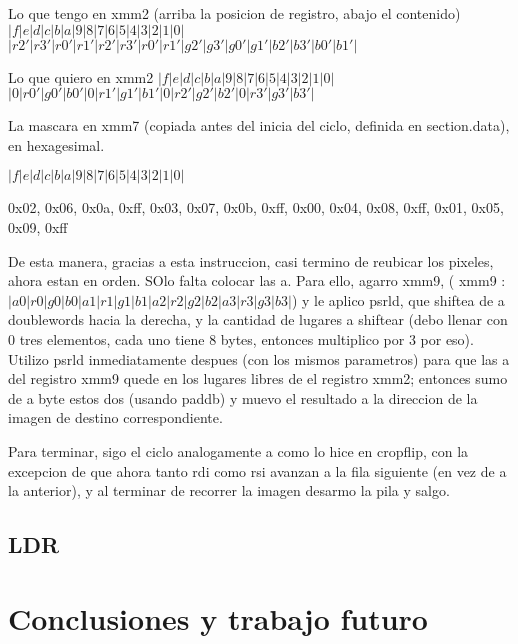 \documentclass[a4paper]{article}
\begin{document}
    Lo que tengo en xmm2 (arriba la posicion de registro, abajo el contenido)
    \hfill \break
 $|  f  |  e  |  d  |  c  |  b  |  a  |  9  |  8  |  7  |  6  |  5  |  4  |  3  |  2  |  1  |  0  |$
 \hfill \break
$ | r2' | r3' | r0' | r1' | r2' | r3' | r0' | r1' | g2' | g3' | g0' | g1' | b2' | b3' | b0' | b1' | $
 \hfill \break
 
 Lo que quiero en xmm2  
 \hfill \break
 $|  f  |  e  |  d  |  c  |  b  |  a  |  9  |  8  |  7  |  6  |  5  |  4  |  3  |  2  |  1  |  0  |$
 \hfill \break
$ |  0  | r0' | g0' | b0' |  0  | r1' | g1' | b1' |  0  | r2' | g2' | b2' |  0  | r3' | g3' | b3' |$
\hfill \break

La mascara en xmm7 (copiada antes del inicia del ciclo, definida en section.data), en hexagesimal.
\hfill \break


$ |  f  |  e  |  d  |  c  |  b  |  a  |  9  |  8  |  7  |  6  |  5  |  4  |  3  |  2  |  1  |  0  |$
\hfill \break

 0x02, 0x06, 0x0a, 0xff, 0x03, 0x07, 0x0b, 0xff, 0x00, 0x04, 0x08, 0xff, 0x01, 0x05, 0x09, 0xff
 \hfill \break
 
 
De esta manera, gracias a esta instruccion, casi termino de reubicar los pixeles, ahora estan en orden. SOlo falta colocar las a. Para ello, agarro xmm9, 
( xmm9 : $| a0 | r0 | g0 | b0 | a1 | r1 | g1 | b1 | a2 | r2 | g2 | b2 | a3 | r3 | g3 | b3 |$) y le aplico  psrld, que shiftea de a doublewords  hacia la derecha, y  
 la cantidad de lugares a shiftear (debo llenar con 0 tres elementos, cada uno tiene 8 bytes, entonces multiplico por 3 por  eso).
 \hfill \break 
 Utilizo psrld inmediatamente despues (con los mismos parametros) para que las a del registro xmm9 quede en los lugares libres de el registro xmm2; entonces sumo de a byte estos dos (usando paddb) y muevo el resultado a la direccion de la imagen de destino correspondiente.
 \hfill \break
 
 Para terminar, sigo el ciclo analogamente a como lo hice en cropflip, con la excepcion de que ahora tanto rdi como rsi avanzan a la fila siguiente (en vez de  a la anterior), y al terminar de recorrer la imagen desarmo la pila y salgo.
 \hfill \break
 

 

    	
    	
    	  
   
     
    
    
	



\subsection{LDR}



\section{Conclusiones y trabajo futuro}
\end{document}

